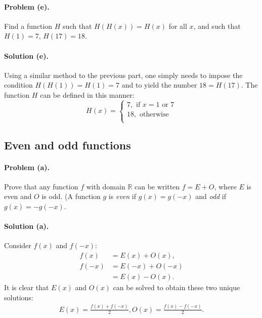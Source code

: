 \documentclass{article}
\begin{document}
\paragraph{Problem (e).} Find a function $H$ such that $H(H(x)) = H(x)$ for all
$x$, and such that $H(1) = 7$, $H(17) = 18$.

\paragraph{Solution (e).} Using a similar method to the previous part, one
simply needs to impose the condition $H(H(1)) = H(1) = 7$ and to yield the
number $18 = H(17)$. The function $H$ can be defined in this manner:
\begin{equation*}
  H(x) = \begin{cases}
    7, \text{ if } x = 1 \text{ or } 7 \\
    18, \text{ otherwise} \\
  \end{cases}
\end{equation*}

\setcounter{subsection}{12}
\subsection{Even and odd functions}

\paragraph{Problem (a).} Prove that any function $f$ with domain $\mathbb{R}$
can be written $f = E + O$, where $E$ is even and $O$ is odd. (A function $g$
is \emph{even} if $g(x) = g(-x)$ and \emph{odd} if $g(x) = -g(-x)$.

\paragraph{Solution (a).} Consider $f(x)$ and $f(-x)$: \begin{align*}
  f(x)  &= E(x) + O(x), \\
  f(-x) &= E(-x) + O(-x) \\
        &= E(x) - O(x).
\end{align*} It is clear that $E(x)$ and $O(x)$ can be solved to obtain these
two unique solutions: \begin{align*}
  E(x) = \frac{f(x) + f(-x)}{2}, O(x) = \frac{f(x) - f(-x)}{2}.
\end{align*}
\end{document}
